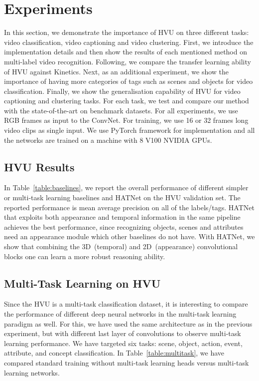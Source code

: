 \documentclass[runningheads]{llncs}
\begin{document}
\section{Experiments}
In this section, we demonstrate the importance of HVU on three  different tasks: video classification, video captioning and video clustering. First, we introduce the implementation details and then show the results of each mentioned method on multi-label video recognition. Following, we compare the transfer learning ability of HVU against Kinetics. Next, as an additional experiment, we show the importance of having more categories of tags such as scenes and objects for video classification. Finally, we show the generalisation capability of HVU for video captioning and clustering tasks.  For each task, we test and compare our method with the state-of-the-art on benchmark datasets. For all experiments, we use RGB frames as input to the ConvNet. For training, we use 16 or 32 frames long video clips as single input. We use PyTorch framework for implementation and all the networks are trained on a machine with 8 V100 NVIDIA GPUs.




\subsection{HVU Results}
In Table~\ref{table:baselines}, we report the overall performance of different simpler or multi-task learning baselines and  HATNet on the HVU validation set. The reported performance is mean average precision on all of the labels/tags. HATNet that exploits both appearance and temporal information in the same pipeline achieves the best performance, since recognizing objects, scenes and attributes need an appearance module which other baselines do not have. With HATNet,  we show that combining the 3D~(temporal) and 2D~(appearance) convolutional blocks one can learn a more robust reasoning ability.



\subsection{Multi-Task Learning on HVU}
Since the HVU is a multi-task classification dataset, it is interesting to compare the performance of different deep neural networks in the multi-task learning paradigm as well. For this, we have used the same architecture as in the previous experiment, but with  different last layer of convolutions to observe multi-task learning performance. We have targeted six tasks: scene, object, action, event, attribute, and concept classification. In Table~\ref{table:multitask}, we have compared standard training without multi-task learning heads versus multi-task learning networks.
\end{document}

